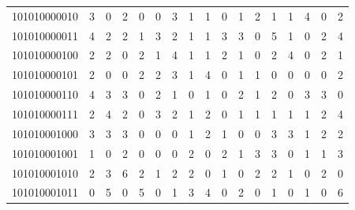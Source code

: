 \documentclass[10pt,a4paper]{article}
\begin{document}
\begin{longtable}{ |c|c|c|c|c|c|c|c|c|c|c|c|c|c|c|c|c| }
    101010000010              & 3                            & 0                                & 2                            & 0                              & 0   & 3   & 1   & 1   & 0   & 1   & 2   & 1   & 1   & 4   & 0   & 2   \\
    101010000011              & 4                            & 2                                & 2                            & 1                              & 3   & 2   & 1   & 1   & 3   & 3   & 0   & 5   & 1   & 0   & 2   & 4   \\
    101010000100              & 2                            & 2                                & 0                            & 2                              & 1   & 4   & 1   & 1   & 2   & 1   & 0   & 2   & 4   & 0   & 2   & 1   \\
    101010000101              & 2                            & 0                                & 0                            & 2                              & 2   & 3   & 1   & 4   & 0   & 1   & 1   & 0   & 0   & 0   & 0   & 2   \\
    101010000110              & 4                            & 3                                & 3                            & 0                              & 2   & 1   & 0   & 1   & 0   & 2   & 1   & 2   & 0   & 3   & 3   & 0   \\
    101010000111              & 2                            & 4                                & 2                            & 0                              & 3   & 2   & 1   & 2   & 0   & 1   & 1   & 1   & 1   & 1   & 2   & 4   \\
    101010001000              & 3                            & 3                                & 3                            & 0                              & 0   & 0   & 1   & 2   & 1   & 0   & 0   & 3   & 3   & 1   & 2   & 2   \\
    101010001001              & 1                            & 0                                & 2                            & 0                              & 0   & 0   & 2   & 0   & 2   & 1   & 3   & 3   & 0   & 1   & 1   & 3   \\
    101010001010              & 2                            & 3                                & 6                            & 2                              & 1   & 2   & 2   & 0   & 1   & 0   & 2   & 2   & 1   & 0   & 2   & 0   \\
    101010001011              & 0                            & 5                                & 0                            & 5                              & 0   & 1   & 3   & 4   & 0   & 2   & 0   & 1   & 0   & 1   & 0   & 6   \\

\end{longtable}
\end{document}

